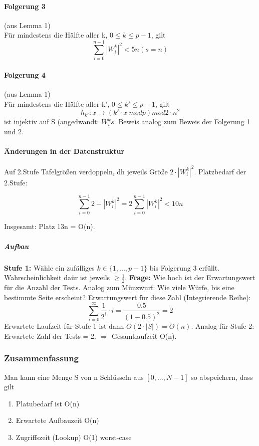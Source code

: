 \paragraph{Folgerung 3} (aus Lemma 1) \\
Für mindestens die Hälfte aller k, $ 0 \leq k \leq p-1 $, gilt 
$$ \sum_{i=0}^{n-1}|W_i^k|^2 < 5n (s=n)$$

\paragraph{Folgerung 4} (aus Lemma 1) \\
Für mindestens die Hälfte aller k', $ 0 \leq k' \leq p-1 $, gilt 
$$ h_{k'}:x\rightarrow (k'\cdot x\ mod p) mod 2 \cdot  n^2 $$
ist injektiv auf S (angedwandt: $ W_i^ks $. Beweis analog zum Beweis der Folgerung 1 und 2.

\paragraph{Änderungen in der Datenstruktur} Auf 2.Stufe Tafelgrößen verdoppeln, dh jeweils Größe $ 2 \cdot |W_i^k|^2 $. Platzbedarf der 2.Stufe:

$$ \sum_{i=0}^{n-1} 2- |W_i^k|^2 = 2 \sum_{i=0}^{n-1} |W_i^k|^2 < 10n $$

Insgesamt: Platz 13n = O(n). 
\subparagraph{Aufbau}
\textbf{Stufe 1:} Wähle ein zufälliges $ k \in \{1,...,p-1 \} $ bis Folgerung 3 erfüllt. Wahrscheinlichkeit daür ist jeweils $ \geq \frac{1}{2} $. \textbf{Frage:} Wie hoch ist der Erwartungswert für die Anzahl der Tests. Analog zum Münzwurf: Wie viele Würfe, bis eine bestimmte Seite erscheint?
Erwartungswert für diese Zahl (Integrierende Reihe): 
$$ \sum_{i=0}^\infty \frac{1}{2^i} \cdot i = \frac{0.5}{(1-0.5)^2} = 2 $$
Erwartete Laufzeit für Stufe 1 ist dann $ O(2 \cdot |S|) = O(n) $. Analog für Stufe 2: Erwartete Zahl der Tests = 2. $ \Rightarrow $ Gesamtlaufzeit O(n).

\subsubsection{Zusammenfassung}
Man kann eine Menge S von n Schlüsseln aus $ [0,...,N-1] $ so abspeichern, dass gilt 
\begin{enumerate}
    \item Platubedarf ist O(n)
    \item Erwartete Aufbauzeit O(n)
    \item Zugriffszeit (Lookup) O(1) worst-case
\end{enumerate}

